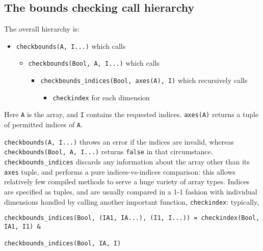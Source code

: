 \hypertarget{17261866997775737461}{}


\subsection{The bounds checking call hierarchy}



The overall hierarchy is:



\begin{itemize}
\item \texttt{checkbounds(A, I...)} which calls

\begin{itemize}
\item \texttt{checkbounds(Bool, A, I...)} which calls

\begin{itemize}
\item \texttt{checkbounds\_indices(Bool, axes(A), I)} which recursively calls

\begin{itemize}
\item \texttt{checkindex} for each dimension

\end{itemize}
\end{itemize}
\end{itemize}
\end{itemize}


Here \texttt{A} is the array, and \texttt{I} contains the {\textquotedbl}requested{\textquotedbl} indices. \texttt{axes(A)} returns a tuple of {\textquotedbl}permitted{\textquotedbl} indices of \texttt{A}.



\texttt{checkbounds(A, I...)} throws an error if the indices are invalid, whereas \texttt{checkbounds(Bool, A, I...)} returns \texttt{false} in that circumstance.  \texttt{checkbounds\_indices} discards any information about the array other than its \texttt{axes} tuple, and performs a pure indices-vs-indices comparison: this allows relatively few compiled methods to serve a huge variety of array types. Indices are specified as tuples, and are usually compared in a 1-1 fashion with individual dimensions handled by calling another important function, \texttt{checkindex}: typically,




\begin{verbatim}
checkbounds_indices(Bool, (IA1, IA...), (I1, I...)) = checkindex(Bool, IA1, I1) &
                                                      checkbounds_indices(Bool, IA, I)
\end{verbatim}



